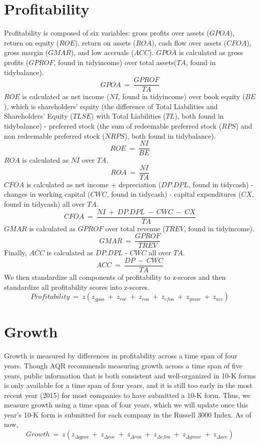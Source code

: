 \documentclass[12pt]{article}
\begin{document}

\section*{Profitability}
Profitability is composed of six variables: gross profits over assets ($GPOA$), return on equity ($ROE$), return on assets ($ROA$), cash flow over assets ($CFOA$), gross margin ($GMAR$), and low accruals ($ACC$). $GPOA$ is calculated as gross profits ($GPROF$, found in tidyincome) over total assets($TA$, found in tidybalance). $$GPOA \ = \ \frac{GPROF}{TA}$$ $ROE$ is calculated as net income ($NI$, found in tidyincome) over book equity ($BE$), which is shareholders' equity (the difference of Total Liabilities and Shareholders' Equity ($TLSE$) with Total Liabilities ($TL$), both found in tidybalance) - preferred stock (the sum of redeemable preferred stock ($RPS$) and non redeemable preferred stock ($NRPS$), both found in tidybalance). $$ROE \ = \ \frac{NI}{BE}$$ $ROA$ is calculated as $NI$ over $TA$. $$ROA \ = \ \frac{NI}{TA}$$ $CFOA$ is calculated as net income + depreciation ($DP.DPL$, found in tidycash) - changes in working capital ($CWC$, found in tidycash) - capital expenditures ($CX$, found in tidycash) all over $TA$. $$CFOA \ = \ \frac{NI \ + \ DP.DPL \ - \ CWC \ - \ CX}{TA}$$ $GMAR$ is calculated as $GPROF$ over total revenue ($TREV$, found in tidyincome). $$GMAR \ = \ \frac{GPROF}{TREV}$$ Finally, $ACC$ is calculated as $DP.DPL$ - $CWC$ all over $TA$. $$ACC \ = \ \frac{DP \ - \ CWC}{TA}$$ We then standardize all components of profitability to z-scores and then standardize all profitability scores into z-scores. $$Profitability \ = \ z(z_{gpoa} \ + \ z_{roe} \ + \ z_{roa} \ + \ z_{cfoa} \ + \ z_{gmar} \ + \ z_{acc})$$
\section*{Growth}
Growth is measured by differences in profitability across a time span of four years. Though AQR recommends measuring growth across a time span of five years, public information that is both consistent and well-organized in 10-K forms is only available for a time span of four years, and it is still too early in the most recent year (2015) for most companies to have submitted a 10-K form. Thus, we measure growth using a time span of four years, which we will update once this year's 10-K form is submitted for each company in the Russell 3000 Index. As of now, $$Growth \ = \ z(z_{\Delta gpoa} \ + \ z_{\Delta roe} \ + \ z_{\Delta roa} \ + \ z_{\Delta cfoa} \ + \ z_{\Delta gmar} \ + \ z_{\Delta acc})$$
\end{document}
